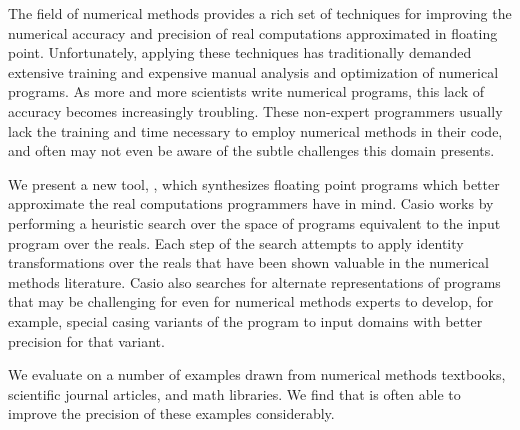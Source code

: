 \documentclass[paper.tex]{subfiles}
\begin{document}
The field of numerical methods provides a rich set of techniques for
improving the numerical accuracy and precision of real computations
approximated in floating point.  Unfortunately, applying these techniques
has traditionally demanded extensive training and expensive manual analysis
and optimization of numerical programs.  As more and more scientists write
numerical programs, this lack of accuracy becomes increasingly troubling.
These non-expert programmers usually lack the training and time necessary
to employ numerical methods in their code, and often may not even be aware
of the subtle challenges this domain presents.

We present a new tool, \casio, which synthesizes floating point programs
which better approximate the real computations programmers have in mind.
Casio works by performing a heuristic search over the space of programs
equivalent to the input program over the reals.  Each step of the search
attempts to apply identity transformations over the reals that have been
shown valuable in the numerical methods literature.  Casio also searches
for alternate representations of programs that may be challenging for even
for numerical methods experts to develop, for example, special casing
variants of the program to input domains with better precision for that
variant.

We evaluate \casio on a number of examples drawn from numerical methods
textbooks, scientific journal articles, and math libraries.  We find that
\casio is often able to improve the precision of these examples
considerably.
\end{document}
